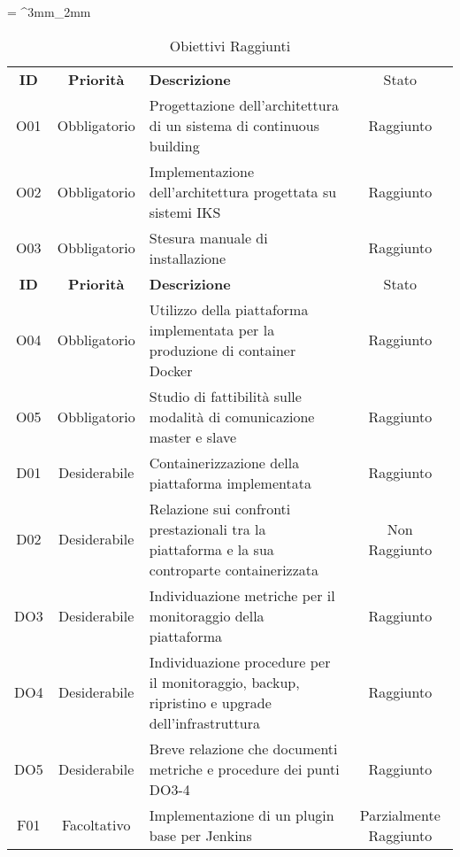 \tabulinesep = ^3mm_2mm
\begin{longtabu} to \textwidth {ccXc}
    \caption[Obiettivi Raggiunti]{Obiettivi Raggiunti}
    \label{tab:obiettivi-finali}
    \endlastfoot
    \rowfont{\bfseries\sffamily\leavevmode\color{white}}
    \textbf{ID} & \textbf{Priorità} & \textbf{Descrizione} & Stato \\
    O01 & Obbligatorio & Progettazione dell’architettura di un sistema di \gls{continuous building} & Raggiunto \\ %
    O02 & Obbligatorio & Implementazione dell’architettura progettata su sistemi IKS & Raggiunto \\ %
    O03 & Obbligatorio & Stesura manuale di installazione & Raggiunto \\ %
    \newpage
    \rowfont{\bfseries\sffamily\leavevmode\color{white}}
    \textbf{ID} & \textbf{Priorità} & \textbf{Descrizione} & Stato \\
    O04 & Obbligatorio & Utilizzo della piattaforma implementata per la produzione di \gls{container} Docker & Raggiunto \\ %
    O05 & Obbligatorio & Studio di fattibilità sulle modalità di comunicazione master e slave & Raggiunto \\ %
    D01 & Desiderabile & Containerizzazione della piattaforma implementata & Raggiunto\\ %
    D02 & Desiderabile & Relazione sui confronti prestazionali tra la piattaforma e la sua controparte containerizzata & Non Raggiunto\\ %
    DO3 & Desiderabile & Individuazione metriche per il monitoraggio della piattaforma & Raggiunto \\ %
    DO4 & Desiderabile &  Individuazione procedure per il monitoraggio, backup, ripristino e upgrade dell’infrastruttura & Raggiunto\\ %
    DO5 & Desiderabile & Breve relazione che documenti metriche e procedure dei punti DO3-4 & Raggiunto\\ %
    F01 & Facoltativo & Implementazione di un plugin base per Jenkins & Parzialmente Raggiunto\\ %
\end{longtabu}